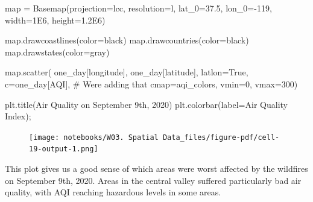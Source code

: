 \documentclass[
  letterpaper,
  DIV=11,
  numbers=noendperiod]{scrreprt}
\newenvironment{Shaded}{\begin{snugshade}}{\end{snugshade}}
\newcommand{\BuiltInTok}[1]{\textcolor[rgb]{0.00,0.23,0.31}{#1}}
\newcommand{\CommentTok}[1]{\textcolor[rgb]{0.37,0.37,0.37}{#1}}
\newcommand{\DecValTok}[1]{\textcolor[rgb]{0.68,0.00,0.00}{#1}}
\newcommand{\FloatTok}[1]{\textcolor[rgb]{0.68,0.00,0.00}{#1}}
\newcommand{\NormalTok}[1]{\textcolor[rgb]{0.00,0.23,0.31}{#1}}
\newcommand{\OperatorTok}[1]{\textcolor[rgb]{0.37,0.37,0.37}{#1}}
\newcommand{\StringTok}[1]{\textcolor[rgb]{0.13,0.47,0.30}{#1}}
\newcommand{\VariableTok}[1]{\textcolor[rgb]{0.07,0.07,0.07}{#1}}
\begin{document}
\begin{Shaded}
\begin{Highlighting}[]
\BuiltInTok{map} \OperatorTok{=}\NormalTok{ Basemap(projection}\OperatorTok{=}\StringTok{\textquotesingle{}lcc\textquotesingle{}}\NormalTok{, resolution}\OperatorTok{=}\StringTok{\textquotesingle{}l\textquotesingle{}}\NormalTok{, }
\NormalTok{            lat\_0}\OperatorTok{=}\FloatTok{37.5}\NormalTok{, lon\_0}\OperatorTok{={-}}\DecValTok{119}\NormalTok{,}
\NormalTok{            width}\OperatorTok{=}\FloatTok{1E6}\NormalTok{, height}\OperatorTok{=}\FloatTok{1.2E6}\NormalTok{)}

\BuiltInTok{map}\NormalTok{.drawcoastlines(color}\OperatorTok{=}\StringTok{\textquotesingle{}black\textquotesingle{}}\NormalTok{)}
\BuiltInTok{map}\NormalTok{.drawcountries(color}\OperatorTok{=}\StringTok{\textquotesingle{}black\textquotesingle{}}\NormalTok{)}
\BuiltInTok{map}\NormalTok{.drawstates(color}\OperatorTok{=}\StringTok{\textquotesingle{}gray\textquotesingle{}}\NormalTok{)}

\BuiltInTok{map}\NormalTok{.scatter(}
\NormalTok{      one\_day[}\StringTok{\textquotesingle{}longitude\textquotesingle{}}\NormalTok{], }
\NormalTok{      one\_day[}\StringTok{\textquotesingle{}latitude\textquotesingle{}}\NormalTok{], }
\NormalTok{      latlon}\OperatorTok{=}\VariableTok{True}\NormalTok{, }
\NormalTok{      c}\OperatorTok{=}\NormalTok{one\_day[}\StringTok{\textquotesingle{}AQI\textquotesingle{}}\NormalTok{], }\CommentTok{\# We\textquotesingle{}re adding that }
\NormalTok{      cmap}\OperatorTok{=}\NormalTok{aqi\_colors, }
\NormalTok{      vmin}\OperatorTok{=}\DecValTok{0}\NormalTok{, }
\NormalTok{      vmax}\OperatorTok{=}\DecValTok{300}\NormalTok{)}


\NormalTok{plt.title(}\StringTok{\textquotesingle{}Air Quality on September 9th, 2020\textquotesingle{}}\NormalTok{)}
\NormalTok{plt.colorbar(label}\OperatorTok{=}\StringTok{\textquotesingle{}Air Quality Index\textquotesingle{}}\NormalTok{)}\OperatorTok{;}
\end{Highlighting}
\end{Shaded}

\begin{figure}[H]

{\centering \texttt{[image: notebooks/W03. Spatial Data\_files/figure-pdf/cell-19-output-1.png]}

}

\end{figure}

This plot gives us a good sense of which areas were worst affected by
the wildfires on September 9th, 2020. Areas in the central valley
suffered particularly bad air quality, with AQI reaching hazardous
levels in some areas.
\end{document}
